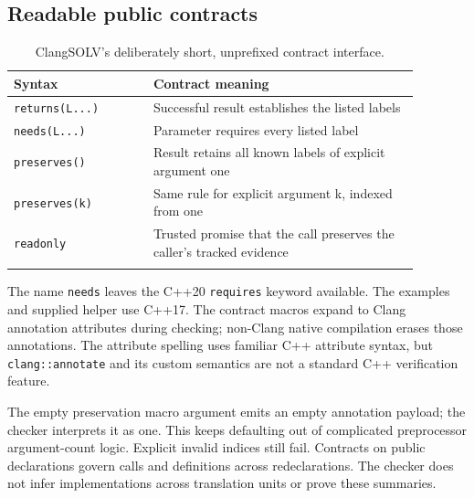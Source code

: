 \documentclass[11pt]{article}
\begin{document}
\subsection{Readable public contracts}
\begin{longtable}{>{\raggedright\arraybackslash}p{0.30\linewidth}>{\raggedright\arraybackslash}p{0.58\linewidth}}
\toprule
Syntax & Contract meaning\\\midrule
\endhead
\texttt{returns(L...)} & Successful result establishes the listed labels\\
\texttt{needs(L...)} & Parameter requires every listed label\\
\texttt{preserves()} & Result retains all known labels of explicit argument one\\
\texttt{preserves(k)} & Same rule for explicit argument k, indexed from one\\
\texttt{readonly} & Trusted promise that the call preserves the caller's tracked evidence\\
\bottomrule
\caption{ClangSOLV's deliberately short, unprefixed contract interface.}
\end{longtable}
The name \texttt{needs} leaves the C++20 \texttt{requires} keyword available.
The examples and supplied helper use C++17. The contract macros expand to
Clang annotation attributes during checking; non-Clang native compilation
erases those annotations. The attribute spelling uses familiar C++ attribute
syntax, but \texttt{clang::annotate} and its custom semantics are not a
standard C++ verification feature.

The empty preservation macro argument emits an empty annotation payload;
the checker interprets it as one. This keeps defaulting out of complicated
preprocessor argument-count logic. Explicit invalid indices still fail.
Contracts on public declarations govern calls and definitions across
redeclarations. The checker does not infer implementations across translation
units or prove these summaries.
\end{document}
